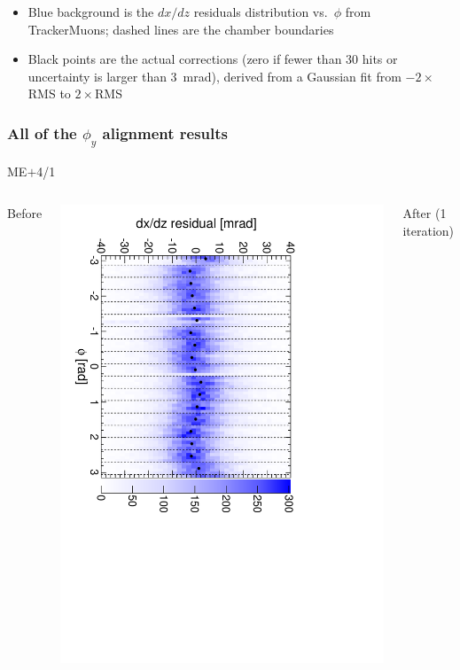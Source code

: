 \documentclass[compress]{beamer}
\begin{document}
\begin{frame}
\begin{itemize}
\item Blue background is the $dx/dz$ residuals distribution
  vs.\ $\phi$ from TrackerMuons; dashed lines are the chamber boundaries
\item Black points are the actual corrections (zero if fewer than 30
  hits or uncertainty is larger than 3~mrad), derived from a Gaussian
  fit from $-2\times$RMS to $2\times$RMS
\end{itemize}
\end{frame}

\begin{frame}
\frametitle{All of the $\phi_y$ alignment results}
\begin{center}
ME$+$4/1
\end{center}

\begin{columns}
\centering Before

\includegraphics[height=\linewidth, angle=90]{iter01_mep41.pdf}

\centering After (1 iteration)


\end{columns}
\end{frame}
\end{document}
